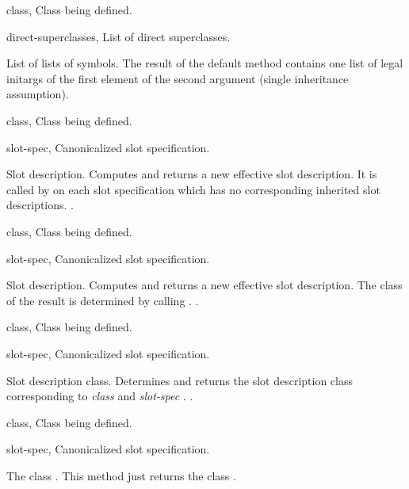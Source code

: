 \begin{optDefinition}
%
\begin{specargs}
    \item[class, \classref{class}] Class being defined.
    \item[direct-superclasses, \classref{list}] List of direct superclasses.
\end{specargs}
%
\result%
List of lists of symbols.
%
\remarks%
The result of the default method
contains one list of legal initargs of the first element of the second
argument (single inheritance assumption).

%
\begin{genericargs}
    \item[class, \classref{class}] Class being defined.
    \item[slot-spec, \classref{list}] Canonicalized slot specification.
\end{genericargs}
%
\result%
Slot description.
%
\remarks%
Computes and returns a new effective slot description.  It is called by
 on each slot specification which has no
corresponding inherited slot descriptions.  \seealso%
.

%
\begin{specargs}
    \item[class, \classref{class}] Class being defined.
    \item[slot-spec, \classref{list}] Canonicalized slot specification.
\end{specargs}
%
\result%
Slot description.
%
\remarks%
Computes and returns a new effective slot description.  The class of the result
is determined by calling .
%
\seealso%
.

%
\begin{genericargs}
    \item[class, \classref{class}] Class being defined.
    \item[slot-spec, \classref{list}] Canonicalized slot specification.
\end{genericargs}
%
\result%
Slot description class.
%
\remarks%
Determines and returns the slot description class corresponding to {\em class}
and {\em slot-spec} .  \seealso {}.

%
\begin{specargs}
    \item[class, \classref{class}] Class being defined.
    \item[slot-spec, \classref{list}] Canonicalized slot specification.
\end{specargs}
%
\result%
The class .
%
\remarks%
This method just returns the class .


\end{optDefinition}
